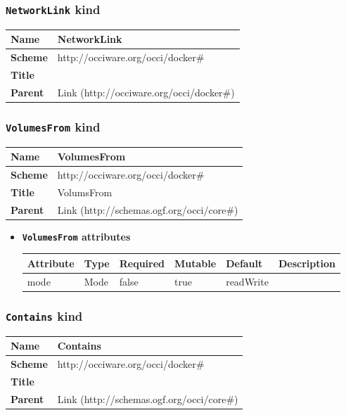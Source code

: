 \subsubsection{\texttt{NetworkLink} kind}
\begin{center}
\begin{tabular}{|l|l|}
  \hline
  \textbf{Name} & NetworkLink \\
  \hline  
  \textbf{Scheme} & http://occiware.org/occi/docker\# \\
  \hline
  \textbf{Title} &  \\
  \hline
  \textbf{Parent} & Link (http://occiware.org/occi/docker\#) \\
  \hline
\end{tabular}
\end{center}



\subsubsection{\texttt{VolumesFrom} kind}
\begin{center}
\begin{tabular}{|l|l|}
  \hline
  \textbf{Name} & VolumesFrom \\
  \hline  
  \textbf{Scheme} & http://occiware.org/occi/docker\# \\
  \hline
  \textbf{Title} & VolumsFrom \\
  \hline
  \textbf{Parent} & Link (http://schemas.ogf.org/occi/core\#) \\
  \hline
\end{tabular}
\end{center}
\begin{itemize}
\item \textbf{\texttt{VolumesFrom} attributes}

\begin{tabularx}{\textwidth}{|l|l|p{1.4cm}|p{1.3cm}|l|X|}
  \hline
  \textbf{Attribute} & \textbf{Type} & \textbf{Required} & \textbf{Mutable} & \textbf{Default} & \textbf{Description} \\
  \hline  
  mode & Mode & false & true & readWrite &  \\
  \hline
\end{tabularx}
\end{itemize}



\subsubsection{\texttt{Contains} kind}
\begin{center}
\begin{tabular}{|l|l|}
  \hline
  \textbf{Name} & Contains \\
  \hline  
  \textbf{Scheme} & http://occiware.org/occi/docker\# \\
  \hline
  \textbf{Title} &  \\
  \hline
  \textbf{Parent} & Link (http://schemas.ogf.org/occi/core\#) \\
  \hline
\end{tabular}
\end{center}



